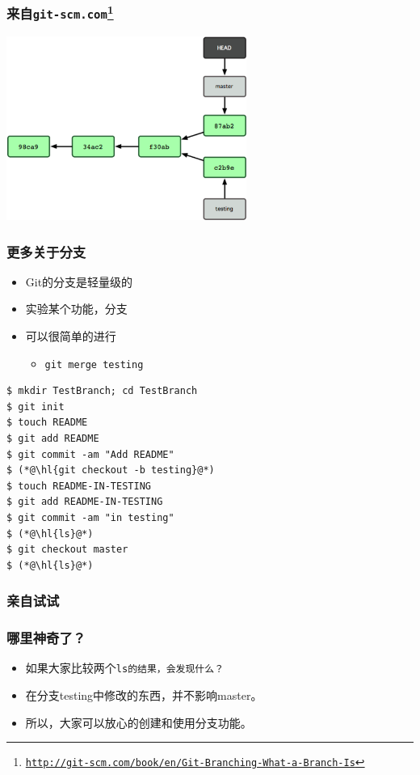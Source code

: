 \begin{frame}
    \frametitle{来自\tt{git-scm.com}\footnote{\url{http://git-scm.com/book/en/Git-Branching-What-a-Branch-Is}}}
    \includegraphics[height=6cm,keepaspectratio]{data/GitBranch.png}
\end{frame}

\begin{frame}
    \frametitle{更多关于分支}
    \begin{itemize}    
        \item Git的分支是轻量级的
        \item 实验某个功能，{}分支
        \item 可以很简单的进行{}
            \begin{itemize}
                \item \tt{\footnotesize{git merge testing}}
            \end{itemize}
    \end{itemize}
\end{frame}


\newsavebox{\TryGitBranch}
\begin{lrbox}{\TryGitBranch}
\begin{lstlisting}
$ mkdir TestBranch; cd TestBranch
$ git init
$ touch README
$ git add README
$ git commit -am "Add README"
$ (*@\hl{git checkout -b testing}@*)
$ touch README-IN-TESTING
$ git add README-IN-TESTING
$ git commit -am "in testing"
$ (*@\hl{ls}@*)
$ git checkout master
$ (*@\hl{ls}@*)
\end{lstlisting}
\end{lrbox}

\begin{frame}
    \frametitle{亲自试试}
    \par\usebox{\TryGitBranch}
\end{frame}

\begin{frame}
    \frametitle{哪里神奇了？}
        \begin{itemize}
            \item 如果大家比较两个\tt{ls}的结果，会发现什么？
            \item 在分支testing中修改的东西，并不影响master。
            \item 所以，大家可以放心的创建和使用分支功能。
        \end{itemize}
\end{frame}


